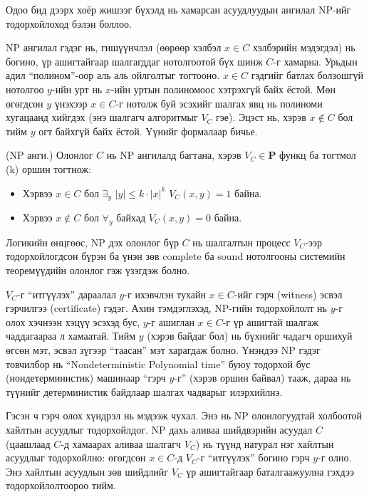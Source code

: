 Одоо бид дээрх хоёр жишээг бүхэлд нь хамарсан асуудлуудын ангилал NP-ийг тодорхойлоход бэлэн боллоо.


NP ангилал гэдэг нь, гишүүнчлэл (өөрөөр хэлбэл $x \in C$ хэлбэрийн мэдэгдэл) нь богино, үр ашигтайгаар шалгагддаг нотолгоотой бүх шинж $C$-г хамарна. Урьдын адил “полином”-оор аль аль ойлголтыг тогтооно. $x \in C$  гэдгийг батлах болзошгүй нотолгоо $y$-ийн урт нь $x$-ийн уртын полиномоос хэтрэхгүй байх ёстой. Мөн өгөгдсөн $y$ үнэхээр $x \in C$-г нотолж буй эсэхийг шалгах явц нь полиноми хугацаанд хийгдэх (энэ шалгагч алгоритмыг $V_C$ гэе). Эцэст нь, хэрэв $x \notin C$ бол тийм $y$ огт байхгүй байх ёстой. Үүнийг формалаар бичье.


\begin{definition}
  (NP анги.) Олонлог $C$ нь NP ангилалд багтана, хэрэв $V_C \in \textbf{P}$ функц ба тогтмол (k) оршин тогтнож:
  \begin{itemize}
    \item Хэрвээ $x \in C$ бол $\exists _y$ $|y| \leq k \cdot |x|^k$ $V_C(x,y)=1$ байна.
    \item Хэрвээ $x \notin C$ бол $\forall _y$ байхад $V_C(x,y)=0$ байна.
  \end{itemize}
\end{definition}


Логикийн өнцгөөс, NP дэх олонлог бүр $C$ нь шалгалтын процесс $V_C$-ээр тодорхойлогдсон бүрэн ба үнэн зөв complete ба sound нотолгооны системийн теоремүүдийн олонлог гэж үзэгдэж болно.


$V_C$-г “итгүүлэх” дараалал $y$-г ихэвчлэн тухайн $x \in C$-ийг гэрч (witness) эсвэл гэрчилгээ (certificate) гэдэг. Ахин тэмдэглэхэд, NP-гийн тодорхойлолт нь $y$-г олох хэчнээн хэцүү эсэхэд бус, $y$-г ашиглан $x \in C$-г үр ашигтай шалгаж чаддагаараа л хамаатай. Тийм $y$ (хэрэв байдаг бол) нь бүхнийг чадагч оршихуй өгсөн мэт, эсвэл зүгээр “таасан” мэт харагдаж болно. Үнэндээ NP гэдэг товчилбор нь “Nondeterministic Polynomial time” буюу тодорхой бус (нондетерминистик) машинаар “гэрч $y$-г” (хэрэв оршин байвал) тааж, дараа нь түүнийг детерминистик байдлаар шалгах чадварыг илэрхийлнэ.


Гэсэн ч гэрч олох хүндрэл нь мэдээж чухал. Энэ нь NP олонлогуудтай холбоотой хайлтын асуудлыг тодорхойлдог. NP дахь аливаа шийдвэрийн асуудал $C$ (цаашлаад $C$-д хамаарах аливаа шалгагч $V_C$) нь түүнд натурал нэг хайлтын асуудлыг тодорхойлно: өгөгдсөн $x \in C$-д $V_C$-г “итгүүлэх” богино гэрч $y$-г олно. Энэ хайлтын асуудлын зөв шийдлийг $V_C$ үр ашигтайгаар баталгаажуулна гэхдээ тодорхойлолтоороо тийм.


